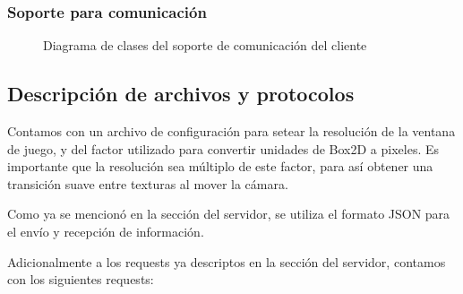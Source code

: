 \documentclass[a4paper]{article}
\begin{document}
\newpage

\subsubsection{Soporte para comunicación}


\begin{figure}[!h]
	\caption{Diagrama de clases del soporte de comunicación del cliente}
	\label{fig:diagram10}
\end{figure}

\subsection{Descripción de archivos y protocolos}

Contamos con un archivo de configuración para setear la resolución de la ventana de juego, y del factor utilizado para convertir unidades de Box2D a pixeles. Es importante que la resolución sea múltiplo de este factor, para así obtener una transición suave entre texturas al mover la cámara.

Como ya se mencionó en la sección del servidor, se utiliza el formato JSON para el envío y recepción de información.

Adicionalmente a los requests ya descriptos en la sección del servidor, contamos con los siguientes requests:
\end{document}
